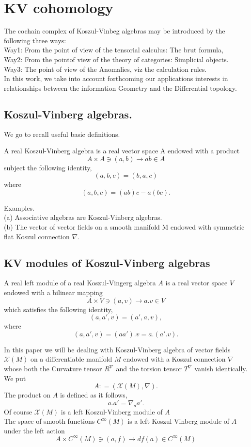 \section{KV cohomology}
The cochain complex of Koszul-Vinbeg algebras may be introduced by the following three ways:\cite{Foliations-webs-Hessian Geometry-Information Geometry-Entropy and Homology.}\\
Way1: From the point of view of the tensorial calculus: The brut formula,\\
Way2: From the pointof view of the theory of categories: Simplicial objects.\\
Way3: The point of view of the Anomalies, viz the calculation  rules.\\
In this work, we take into account forthcoming our applications interests in relationships between the information Geometry and the Differential topology.\\
\subsection{Koszul-Vinberg algebras.}
We go to recall useful basic definitions.
\begin{defn} A real Koszul-Vinberg algebra is a real vector space A endowed with a product 
$$A \times A \ni (a,b)\rightarrow ab \in A$$
subject the following identity,
$$(a,b,c) = (b,a,c)$$ 
where
$$(a,b,c) = (ab)c - a(bc).$$
\end{defn}
Examples. \\
(a) Associative algebras are Koszul-Vinberg algebras.\\
(b) The vector of vector fields on a smooth manifold M endowed with symmetric flat Koszul connection $\nabla$.\\
\subsection{KV modules of Koszul-Vinberg algebras}
\begin{defn} A real left module of a real Koszul-Vingerg algebra $A$ is a real vector space $V$ endowed with a bilinear mapping
$$A \times V \ni (a,v) \rightarrow a.v \in V$$
which satisfies the following identity,
$$(a,a',v) = (a',a,v),$$
where
$$(a, a',v) = (aa').v = a.(a'.v).$$
\end{defn}
In this paper we will be dealing with Koszul-Vinberg algebra of vector fields $\mathcal{X}(M)$ on a differentiable manifold $M$ endowed with a Koszul connection $\nabla$ whose both the Curvature tensor $R^\nabla$ and the torsion tensor $T^\nabla$ vanish identically.\\
We put 
$$A : = (\mathcal{X}(M), \nabla).$$
The product on $A$ is defined as it follows,
$$a.a' =\nabla_aa'.$$
Of course $\mathcal{X}(M)$ is a left Koszul-Vinberg module of $A$\\
The space of smooth functions $C^\infty(M)$ is a left Koszul-Vinberg module of $A$ under the left action
$$A \times C^\infty(M) \ni (a,f) \rightarrow df(a) \in C^\infty(M)$$
